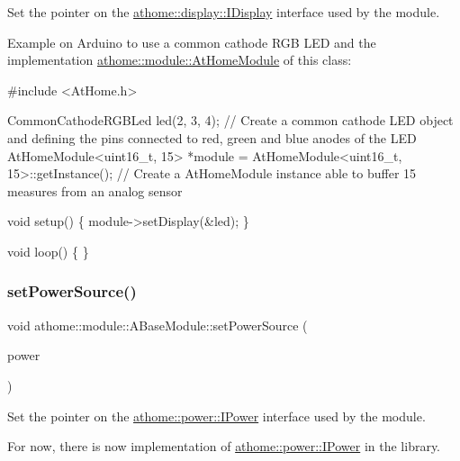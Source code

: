 Set the pointer on the \mbox{\hyperlink{classathome_1_1display_1_1_i_display}{athome\+::display\+::\+I\+Display}} interface used by the module.

Example on Arduino to use a common cathode R\+GB L\+ED and the implementation \mbox{\hyperlink{classathome_1_1module_1_1_at_home_module}{athome\+::module\+::\+At\+Home\+Module}} of this class\+:


\begin{DoxyCode}
\textcolor{preprocessor}{#include <AtHome.h>}

CommonCathodeRGBLed led(2, 3, 4); \textcolor{comment}{// Create a common cathode LED object and}
defining the pins connected to red, green and blue anodes of the LED
AtHomeModule<uint16\_t, 15> *module = AtHomeModule<uint16\_t,
15>::getInstance(); \textcolor{comment}{// Create a AtHomeModule instance able to buffer 15}
measures from an analog sensor

\textcolor{keywordtype}{void} setup() \{
  module->setDisplay(&led);
\}

\textcolor{keywordtype}{void} loop() \{
\}
\end{DoxyCode}
 \mbox{\label{classathome_1_1module_1_1_a_base_module_a0c217f9a8d052efc5490bc9145fdf7f9}} 
\subsubsection{\texorpdfstring{set\+Power\+Source()}{setPowerSource()}}
{\footnotesize\ttfamily void athome\+::module\+::\+A\+Base\+Module\+::set\+Power\+Source (\begin{DoxyParamCaption}\item[{\mbox{\hyperlink{classathome_1_1power_1_1_i_power}{power\+::\+I\+Power}} $\ast$}]{power }\end{DoxyParamCaption})}

Set the pointer on the \mbox{\hyperlink{classathome_1_1power_1_1_i_power}{athome\+::power\+::\+I\+Power}} interface used by the module.

For now, there is now implementation of \mbox{\hyperlink{classathome_1_1power_1_1_i_power}{athome\+::power\+::\+I\+Power}} in the library. \mbox{\label{classathome_1_1module_1_1_a_base_module_a071b5d07dc3497908520a5b0dc9404ef}} 
